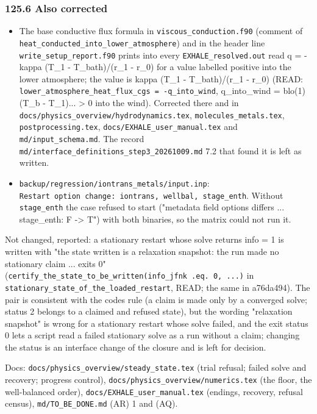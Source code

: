 \documentclass[english,a4paper]{my_memo}
\providecommand{\tightlist}{\setlength{\itemsep}{0pt}\setlength{\parskip}{0pt}}
\begin{document}
\subsubsection{125.6 Also corrected}\label{1256-also-corrected}

\begin{itemize}
\tightlist
\item
  The base conductive flux formula in \texttt{viscous\_conduction.f90} (comment of \texttt{heat\_conducted\_into\_lower\_atmosphere}) and in the header line \texttt{write\_setup\_report.f90} prints into every \texttt{EXHALE\_resolved.out} read q = -kappa (T\_1 - T\_bath)/(r\_1 - r\_0) for a value labelled positive into the lower atmosphere; the value is kappa (T\_1 - T\_bath)/(r\_1 - r\_0) (READ: \texttt{lower\_atmosphere\_heat\_flux\_cgs\ =\ -q\_into\_wind}, q\_into\_wind = blo(1)(T\_b - T\_1)... \textgreater{} 0 into the wind). Corrected there and in \texttt{docs/physics\_overview/hydrodynamics.tex}, \texttt{molecules\_metals.tex}, \texttt{postprocessing.tex}, \texttt{docs/EXHALE\_user\_manual.tex} and \texttt{md/input\_schema.md}. The record \texttt{md/interface\_definitions\_step3\_20261009.md} 7.2 that found it is left as written.
\item
  \texttt{backup/regression/iontrans\_metals/input.inp}: \texttt{Restart\ option\ change:\ iontrans,\ wellbal,\ stage\_enth}. Without \texttt{stage\_enth} the case refused to start ("metadata field options differs ... stage\_enth: F -\textgreater{} T") with both binaries, so the matrix could not run it.
\end{itemize}

Not changed, reported: a stationary restart whose solve returns info = 1 is written with "the state written is a relaxation snapshot: the run made no stationary claim ... exits 0" (\texttt{certify\_the\_state\_to\_be\_written(info\_jfnk\ .eq.\ 0,\ ...)} in \texttt{stationary\_state\_of\_the\_loaded\_restart}, READ; the same in a76da494). The pair is consistent with the code\textquotesingle s rule (a claim is made only by a converged solve; status 2 belongs to a claimed and refused state), but the wording "relaxation snapshot" is wrong for a stationary restart whose solve failed, and the exit status 0 lets a script read a failed stationary solve as a run without a claim; changing the status is an interface change of the closure and is left for decision.

Docs: \texttt{docs/physics\_overview/steady\_state.tex} (trial refusal; failed solve and recovery; progress control), \texttt{docs/physics\_overview/numerics.tex} (the floor, the well-balanced order), \texttt{docs/EXHALE\_user\_manual.tex} (endings, recovery, refusal census), \texttt{md/TO\_BE\_DONE.md} (AR) 1 and (AQ).
\end{document}
